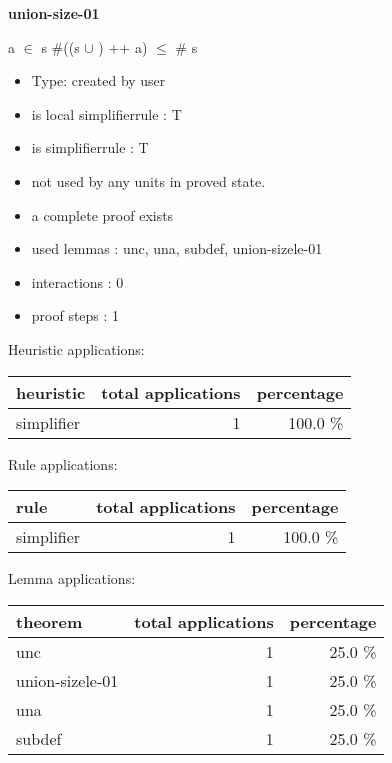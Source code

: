 \documentclass[a4paper]{article}
\begin{document}
{\LARGE\bf union-size-01}\label{lemma-union-size-01}

\medskip

 \Fol \Not a $\in$ s \Imp \Not \#((s $\cup$ ) ++ a) $\le$ \# s

\begin{itemize}

\item Type: created by user

\item is local simplifierrule : T
\item is simplifierrule : T
\item not used by any units in proved state.
\item       a complete proof exists
\item       used lemmas  : unc, una, subdef, union-sizele-01
\item       interactions : 0
\item       proof steps  : 1
\end{itemize}

\medskip


Heuristic applications:

\begin{supertabular}{l|r|r}
heuristic	& total applications & percentage \\ \hline
simplifier & 1 & 100.0 \% \\

\end{supertabular}

Rule applications:

\begin{supertabular}{l|r|r}
rule	        & total applications & percentage \\ \hline
simplifier & 1 & 100.0 \% \\

\end{supertabular}

Lemma applications:

\begin{supertabular}{l|r|r}
theorem	        & total applications & percentage \\ \hline
unc & 1 & 25.0 \% \\
union-sizele-01 & 1 & 25.0 \% \\
una & 1 & 25.0 \% \\
subdef & 1 & 25.0 \% \\

\end{supertabular}
\pagebreak
\end{document}
